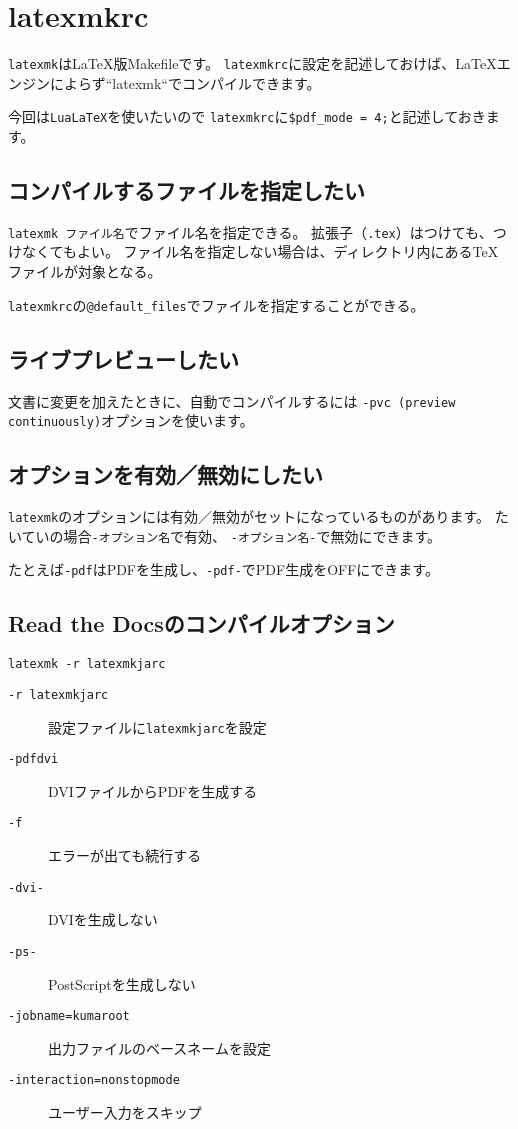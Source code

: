 \section{latexmkrc}

\texttt{latexmk}はLaTeX版Makefileです。
\texttt{latexmkrc}に設定を記述しておけば、LaTeXエンジンによらず``latexmk``でコンパイルできます。

今回は\texttt{LuaLaTeX}を使いたいので
\texttt{latexmkrc}に\texttt{\$pdf\_mode = 4;}と記述しておきます。

\subsection{コンパイルするファイルを指定したい}

\texttt{latexmk ファイル名}でファイル名を指定できる。
拡張子（\texttt{.tex}）はつけても、つけなくてもよい。
ファイル名を指定しない場合は、ディレクトリ内にあるTeXファイルが対象となる。

\texttt{latexmkrc}の\texttt{@default\_files}でファイルを指定することができる。

\subsection{ライブプレビューしたい}

文書に変更を加えたときに、自動でコンパイルするには
\texttt{-pvc (preview continuously)}オプションを使います。

\subsection{オプションを有効／無効にしたい}

\texttt{latexmk}のオプションには有効／無効がセットになっているものがあります。
たいていの場合\texttt{-オプション名}で有効、
\texttt{-オプション名-}で無効にできます。

たとえば\texttt{-pdf}はPDFを生成し、\texttt{-pdf-}でPDF生成をOFFにできます。

\subsection{Read the Docsのコンパイルオプション}

\begin{Verbatim}[frame=leftline]
    latexmk -r latexmkjarc
\end{Verbatim}

\begin{description}
    \item[\texttt{-r latexmkjarc}] 設定ファイルに\texttt{latexmkjarc}を設定
    \item[\texttt{-pdfdvi}] DVIファイルからPDFを生成する
    \item[\texttt{-f}] エラーが出ても続行する
    \item[\texttt{-dvi-}] DVIを生成しない
    \item[\texttt{-ps-}] PostScriptを生成しない
    \item[\texttt{-jobname=kumaroot}] 出力ファイルのベースネームを設定
    \item[\texttt{-interaction=nonstopmode}] ユーザー入力をスキップ
\end{description}
